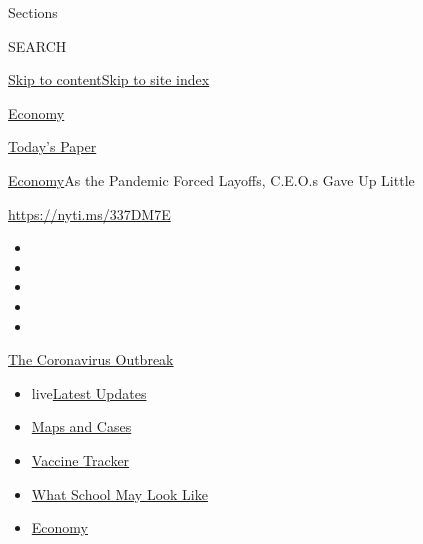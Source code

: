 Sections

SEARCH

\protect\hyperlink{site-content}{Skip to
content}\protect\hyperlink{site-index}{Skip to site index}

\href{https://www.nytimes3xbfgragh.onion/section/business/economy}{Economy}

\href{https://myaccount.nytimes3xbfgragh.onion/auth/login?response_type=cookie\&client_id=vi}{}

\href{https://www.nytimes3xbfgragh.onion/section/todayspaper}{Today's
Paper}

\href{/section/business/economy}{Economy}\textbar{}As the Pandemic
Forced Layoffs, C.E.O.s Gave Up Little

\url{https://nyti.ms/337DM7E}

\begin{itemize}
\item
\item
\item
\item
\item
\end{itemize}

\href{https://www.nytimes3xbfgragh.onion/news-event/coronavirus?action=click\&pgtype=Article\&state=default\&region=TOP_BANNER\&context=storylines_menu}{The
Coronavirus Outbreak}

\begin{itemize}
\tightlist
\item
  live\href{https://www.nytimes3xbfgragh.onion/2020/08/01/world/coronavirus-covid-19.html?action=click\&pgtype=Article\&state=default\&region=TOP_BANNER\&context=storylines_menu}{Latest
  Updates}
\item
  \href{https://www.nytimes3xbfgragh.onion/interactive/2020/us/coronavirus-us-cases.html?action=click\&pgtype=Article\&state=default\&region=TOP_BANNER\&context=storylines_menu}{Maps
  and Cases}
\item
  \href{https://www.nytimes3xbfgragh.onion/interactive/2020/science/coronavirus-vaccine-tracker.html?action=click\&pgtype=Article\&state=default\&region=TOP_BANNER\&context=storylines_menu}{Vaccine
  Tracker}
\item
  \href{https://www.nytimes3xbfgragh.onion/interactive/2020/07/29/us/schools-reopening-coronavirus.html?action=click\&pgtype=Article\&state=default\&region=TOP_BANNER\&context=storylines_menu}{What
  School May Look Like}
\item
  \href{https://www.nytimes3xbfgragh.onion/live/2020/07/31/business/stock-market-today-coronavirus?action=click\&pgtype=Article\&state=default\&region=TOP_BANNER\&context=storylines_menu}{Economy}
\end{itemize}

